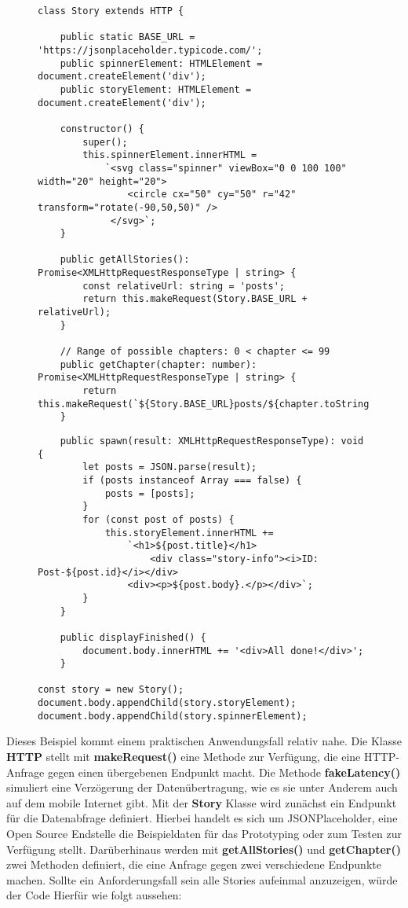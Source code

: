 \begin{figure}[H]
\begin{lstlisting}
class Story extends HTTP {

    public static BASE_URL = 'https://jsonplaceholder.typicode.com/';
    public spinnerElement: HTMLElement = document.createElement('div');
    public storyElement: HTMLElement = document.createElement('div');

    constructor() {
        super();
        this.spinnerElement.innerHTML =
            `<svg class="spinner" viewBox="0 0 100 100" width="20" height="20">
                <circle cx="50" cy="50" r="42" transform="rotate(-90,50,50)" />
             </svg>`;
    }

    public getAllStories(): Promise<XMLHttpRequestResponseType | string> {
        const relativeUrl: string = 'posts';
        return this.makeRequest(Story.BASE_URL + relativeUrl);
    }

    // Range of possible chapters: 0 < chapter <= 99
    public getChapter(chapter: number): Promise<XMLHttpRequestResponseType | string> {
        return this.makeRequest(`${Story.BASE_URL}posts/${chapter.toString()}`);
    }

\end{lstlisting}
\end{figure}
\begin{figure}[H]
\begin{lstlisting}
    public spawn(result: XMLHttpRequestResponseType): void {
        let posts = JSON.parse(result);
        if (posts instanceof Array === false) {
            posts = [posts];
        }
        for (const post of posts) {
            this.storyElement.innerHTML +=
                `<h1>${post.title}</h1>
                    <div class="story-info"><i>ID: Post-${post.id}</i></div>
                <div><p>${post.body}.</p></div>`;
        }
    }

    public displayFinished() {
        document.body.innerHTML += '<div>All done!</div>';
    }

const story = new Story();
document.body.appendChild(story.storyElement);
document.body.appendChild(story.spinnerElement);
\end{lstlisting}
\end{figure}

\noindent
Dieses Beispiel kommt einem praktischen Anwendungsfall relativ nahe. Die Klasse \textbf{HTTP} stellt mit  \textbf{makeRequest()} eine Methode zur Verfügung, die eine HTTP-Anfrage gegen einen übergebenen Endpunkt macht. Die Methode \textbf{fakeLatency()} simuliert eine Verzögerung der Datenübertragung, wie es sie unter Anderem auch auf dem mobile Internet gibt. Mit der \textbf{Story} Klasse wird zunächst ein Endpunkt für die Datenabfrage definiert. Hierbei handelt es sich um JSONPlaceholder, eine Open Source Endstelle die Beispieldaten für das Prototyping oder zum Testen zur Verfügung stellt. Darüberhinaus werden mit \textbf{getAllStories()} und \textbf{getChapter()} zwei Methoden definiert, die eine Anfrage gegen zwei verschiedene Endpunkte machen.  Sollte ein Anforderungsfall sein alle Stories aufeinmal anzuzeigen, würde der Code Hierfür wie folgt aussehen:

